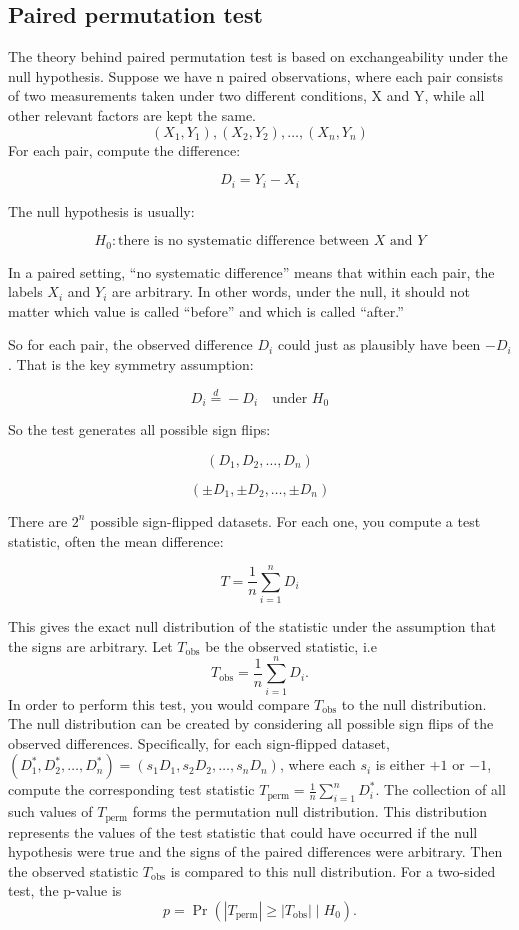 
\subsection*{Paired permutation test}
The theory behind paired permutation test is based on exchangeability under the null hypothesis.
%
Suppose we have n paired observations, where each pair consists of two measurements taken under two different conditions, X and Y, while all other relevant factors are kept the same.
\[
(X_1, Y_1), (X_2, Y_2), \ldots, (X_n, Y_n)
\]
For each pair, compute the difference:

\[
D_i = Y_i - X_i
\]

The null hypothesis is usually:

\[
H_0: \text{there is no systematic difference between } X \text{ and } Y
\]

In a paired setting, “no systematic difference” means that within each pair, the labels \(X_i\) and \(Y_i\) are arbitrary. In other words, under the null, it should not matter which value is called “before” and which is called “after.”

%
%
So for each pair, the observed difference \(D_i\) could just as plausibly have been \(-D_i\). That is the key symmetry assumption:

\[
D_i \overset{d}{=} -D_i \quad \text{under } H_0
\]

So the test generates all possible sign flips:

\[
(D_1, D_2, \ldots, D_n)
\]

\[
(\pm D_1, \pm D_2, \ldots, \pm D_n)
\]

There are \(2^n\) possible sign-flipped datasets. For each one, you compute a test statistic, often the mean difference:

\[
T = \frac{1}{n}\sum_{i=1}^n D_i
\]

This gives the exact null distribution of the statistic under the assumption that the signs are arbitrary.
Let \(T_{\text{obs}}\) be the observed statistic, i.e \[T_{\text{obs}} = \frac{1}{n}\sum_{i=1}^n D_i.\]
In order to perform this test, you would compare \(T_{\text{obs}}\) to the null distribution.
The null distribution can be created by considering all possible sign flips of the observed differences. 
Specifically, for each sign-flipped dataset, \((D_1^*,D_2^*,\ldots,D_n^*)=(s_1D_1,s_2D_2,\ldots,s_nD_n)\), where each \(s_i\) is either \(+1\) or \(-1\), compute the corresponding test statistic \(T_{\text{perm}} = \frac{1}{n}\sum_{i=1}^n D_i^*\).
The collection of all such values of \(T_{\text{perm}}\) forms the permutation null distribution.
This distribution represents the values of the test statistic that could have occurred if the null hypothesis were true and the signs of the paired differences were arbitrary.
Then the observed statistic \(T_{\text{obs}}\) is compared to this null distribution. For a two-sided test, the p-value is
\[
p = \Pr\left(|T_{\text{perm}}| \ge |T_{\text{obs}}| \mid H_0\right).
\]

